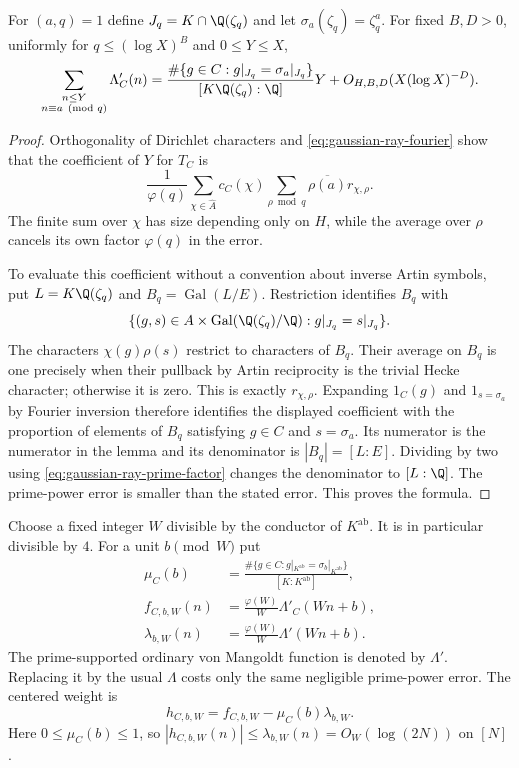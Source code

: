 \begin{lemma}
\label{lem:gaussian-ray-progression}
For $(a,q)=1$ define
$J_q=K\cap\Q(\zeta_q)$ and let $\sigma_a(\zeta_q)=\zeta_q^a$.
For fixed $B,D>0$, uniformly for $q\leq(\log X)^B$ and $0\leq Y\leq X$,
\[
 \sum_{\substack{n\leq Y\\ n\equiv a\pmod q}}\Lambda'_C(n)
 =\frac{\#\{g\in C:g|_{J_q}=\sigma_a|_{J_q}\}}
             {[K\Q(\zeta_q):\Q]}Y
       +O_{H,B,D}(X(\log X)^{-D}).
\]
\end{lemma}
\begin{proof}
Orthogonality of Dirichlet characters and
\eqref{eq:gaussian-ray-fourier} show that the coefficient of $Y$ for
$T_C$ is
\[
 \frac1{\varphi(q)}\sum_{\chi\in\widehat A}c_C(\chi)
       \sum_{\rho\bmod q}\overline{\rho(a)}r_{\chi,\rho}.
\]
The finite sum over $\chi$ has size depending only on $H$, while the
average over $\rho$ cancels its own factor $\varphi(q)$ in the error.

To evaluate this coefficient without a convention about inverse Artin
symbols, put $L=K\Q(\zeta_q)$ and $B_q=\operatorname{Gal}(L/E)$.
Restriction identifies $B_q$ with
\[
 \{(g,s)\in A\times\operatorname{Gal}(\Q(\zeta_q)/\Q):
                       g|_{J_q}=s|_{J_q}\}.
\]
The characters $\chi(g)\rho(s)$ restrict to characters of $B_q$.
Their average on $B_q$ is one precisely when their pullback by Artin
reciprocity is the trivial Hecke character; otherwise it is zero.
This is exactly $r_{\chi,\rho}$.  Expanding $1_C(g)$ and
$1_{s=\sigma_a}$ by Fourier inversion therefore identifies the displayed
coefficient with the proportion of elements of $B_q$ satisfying
$g\in C$ and $s=\sigma_a$.  Its numerator is the numerator in the
lemma and its denominator is $|B_q|=[L:E]$.
Dividing by two using \eqref{eq:gaussian-ray-prime-factor} changes the
denominator to $[L:\Q]$.  The prime-power error is smaller than the stated
error.  This proves the formula.
\end{proof}

Choose a fixed integer $W$ divisible by the conductor of $K^{\mathrm{ab}}$.
It is in particular divisible by $4$.
For a unit $b\pmod W$ put
\[
\begin{aligned}
 \mu_C(b)&=
 \frac{\#\{g\in C:g|_{K^{\mathrm{ab}}}=\sigma_b|_{K^{\mathrm{ab}}}\}}
      {[K:K^{\mathrm{ab}}]},\\
 f_{C,b,W}(n)&=\frac{\varphi(W)}W\Lambda'_C(Wn+b),\\
 \lambda_{b,W}(n)&=\frac{\varphi(W)}W\Lambda'(Wn+b).
\end{aligned}
\]
The prime-supported ordinary von Mangoldt function is denoted by
$\Lambda'$.  Replacing it by the usual $\Lambda$ costs only the same
negligible prime-power error.
The centered weight is
\begin{equation}\label{eq:gaussian-centered-weight}
       h_{C,b,W}=f_{C,b,W}-\mu_C(b)\lambda_{b,W}.
\end{equation}
Here $0\leq\mu_C(b)\leq1$, so
$|h_{C,b,W}(n)|\leq\lambda_{b,W}(n)=O_W(\log(2N))$ on $[N]$.

